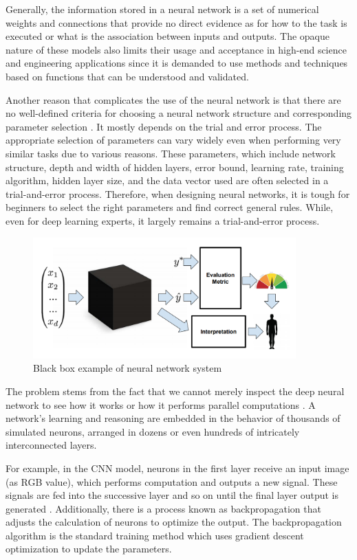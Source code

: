 Generally, the information stored in a neural network is a set of numerical weights and connections that provide no direct evidence as for how to the task is executed or what is the association between inputs and outputs. The opaque nature of these models also limits their usage and acceptance in high-end science and engineering applications since it is demanded to use methods and techniques based on functions that can be understood and validated.

Another reason that complicates the use of the neural network is that there are no well-defined criteria for choosing a neural network structure and corresponding parameter selection \cite{dlvwz}. It mostly depends on the trial and error process. The appropriate selection of parameters can vary widely even when performing very similar tasks due to various reasons. These parameters, which include network structure, depth and width of hidden layers, error bound, learning rate, training algorithm, hidden layer size, and the data vector used are often selected in a trial-and-error process. Therefore, when designing neural networks, it is tough for beginners to select the right parameters and find correct general rules. While, even for deep learning experts, it largely remains a trial-and-error process.

\begin{figure}[htbp]
\centering
\includegraphics[width=0.90\textwidth]{images/Black-box.png}
\caption{Black box example of neural network system}
\label{fig:blackbox}
\end{figure}

The problem stems from the fact that we cannot merely inspect the deep neural network to see how it works or how it performs parallel computations \cite{darksecretaimittr}. A network’s learning and reasoning are embedded in the behavior of thousands of simulated neurons, arranged in dozens or even hundreds of intricately interconnected layers. 

For example, in the CNN model, neurons in the first layer receive an input image (as RGB value), which performs computation and outputs a new signal. These signals are fed into the successive layer and so on until the final layer output is generated \cite{darksecretaimittr}. Additionally, there is a process known as backpropagation that adjusts the calculation of neurons to optimize the output. The backpropagation algorithm is the standard training method which uses gradient descent optimization to update the parameters.

